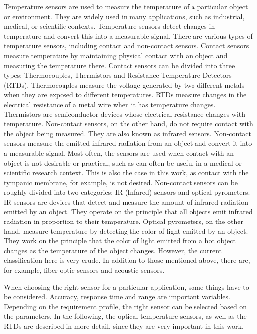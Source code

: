 Temperature sensors are used to measure the temperature of a particular object or environment.
They are widely used in many applications, such as industrial, medical, or scientific contexts.
Temperature sensors detect changes in temperature and convert this into a measurable signal.
There are various types of temperature sensors, including contact and non-contact sensors.
Contact sensors measure temperature by maintaining physical contact with an object and measuring the temperature there.
Contact sensors can be divided into three types: Thermocouples, Thermistors and Resistance Temperature Detectors (RTDs). 
Thermocouples measure the voltage generated by two different metals when they are exposed to different temperatures.
RTDs measure changes in the electrical resistance of a metal wire when it has temperature changes.
Thermistors are semiconductor devices whose electrical resistance changes with temperature.
Non-contact sensors, on the other hand, do not require contact with the object being measured. They are also known as infrared sensors.
Non-contact sensors measure the emitted infrared radiation from an object and convert it into a measurable signal.
Most often, the sensors are used when contact with an object is not desirable or practical, such as can often be useful in a medical or scientific research context. 
This is also the case in this work, as contact with the tympanic membrane, for example, is not desired.
Non-contact sensors can be roughly divided into two categories: IR (Infared) sensors and optical pyrometers.
IR sensors are devices that detect and measure the amount of infrared radiation emitted by an object. They operate on the principle that all objects emit infrared radiation in proportion to their temperature. 
Optical pyrometers, on the other hand, measure temperature by detecting the color of light emitted by an object. They work on the principle that the color of light emitted from a hot object changes as the temperature of the object changes.
However, the current classification here is very crude.
In addition to those mentioned above, there are, for example, fiber optic sensors and acoustic sensors.

When choosing the right sensor for a particular application, some things have to be considered.
Accuracy, response time and range are important variables.
Depending on the requirement profile, the right sensor can be selected based on the parameters.
In the following, the optical temperature sensors, as well as the RTDs are described in more detail, since they are very important in this work.

